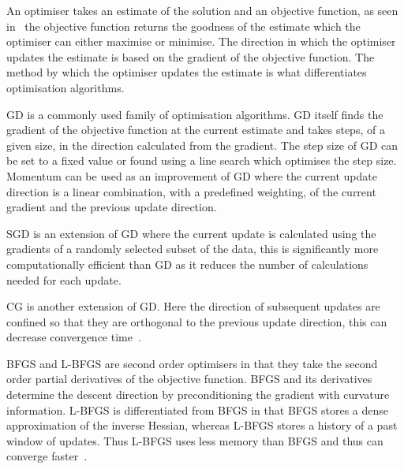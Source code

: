                 An optimiser takes an estimate of the solution and an objective function, as seen in~ the objective function returns the goodness of the estimate which the optimiser can either maximise or minimise. The direction in which the optimiser updates the estimate is based on the gradient of the objective function. The method by which the optimiser updates the estimate is what differentiates optimisation algorithms.
                
                \gls{GD} is a commonly used family of optimisation algorithms. \gls{GD} itself finds the gradient of the objective function at the current estimate %
                and takes steps, of a given size,  in the direction calculated from the gradient. %
                The step size of \gls{GD} can be set to a fixed value or found using a line search which optimises the step size. Momentum can be used as an improvement of \gls{GD} where the current update direction is a linear combination, with a predefined weighting, of the current gradient and the previous update direction.
                
                \gls{SGD} is an extension of \gls{GD} where the current update is calculated using the gradients of a randomly selected subset of the data, %
                this is significantly more computationally efficient than \gls{GD} as it reduces the number of calculations needed for each update.
                
                \gls{CG} is another extension of \gls{GD}. Here the direction of subsequent updates are confined so that they are orthogonal to the previous update direction, this can decrease convergence time~\parencite{Tustison2009}. %
                
                \gls{BFGS} and \gls{L-BFGS} are second order optimisers in that they take the second order partial derivatives of the objective function. \gls{BFGS} and its derivatives determine the descent direction by preconditioning the gradient with curvature information. \gls{L-BFGS} is differentiated from \gls{BFGS} in that \gls{BFGS} stores a dense approximation of the inverse Hessian, whereas \gls{L-BFGS} stores a history of a past window of updates. Thus \gls{L-BFGS} uses less memory than \gls{BFGS} and thus can converge faster~\parencite{Fletcher2000PracticalOptimization}.
                
